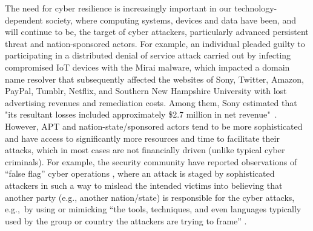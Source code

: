 The need for cyber resilience is increasingly important in our
technology-dependent society, where computing systems, devices and
data have been, and will continue to be, the target of cyber
attackers, particularly advanced persistent threat and
nation-sponsored actors. For example, an individual pleaded guilty to
participating in a distributed denial of service attack carried out by
infecting compromised IoT devices with the Mirai malware, which
impacted a domain name resolver that subsequently affected the
websites of Sony, Twitter, Amazon, PayPal, Tumblr, Netflix, and
Southern New Hampshire University with lost advertising revenues and
remediation costs. Among them, Sony estimated that "its resultant
losses included approximately \$2.7 million in net
revenue"~\cite{USDoJMirai2020}. However, APT and
nation-state/sponsored actors tend to be more sophisticated and have
access to significantly more resources and time to facilitate their
attacks, which in most cases are not financially driven (unlike
typical cyber criminals). For example, the security community have
reported observations of “false flag” cyber operations
\cite{geers2014world,Leyden2019}, where an attack is staged by
sophisticated attackers in such a way to mislead
the intended victims into believing that another party (e.g., another
nation/state) is responsible for the cyber attacks, e.g.,~by using or
mimicking ``the tools, techniques, and even languages typically used
by the group or country the attackers are trying to frame''
\cite{Fruhlinger2020}.

